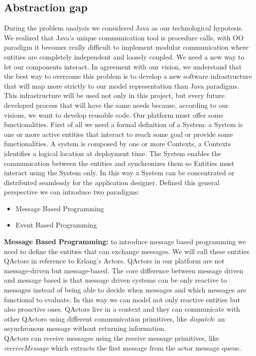 \subsection{Abstraction gap}
During the problem analysis we considered Java as our technological hypotesis.
We realized that Java’s unique communication tool is procedure calls, with
OO paradigm it becomes really difficult to implement modular communication
where entities are completely independent and loosely coupled. We need a new
way to let our components interact. In agreement with our vision, we understand
that the best way to overcome this problem is to develop a new software
infrastructure that will map more strictly to our model representation than Java
paradigms. This infrastructure will be used not only in this project, but every
future developed process that will have the same needs because, according to
our visions, we want to develop reusable code.
Our platform must offer some functionalities. First of all we need a formal definition
of a System:
a System is one or more active entities that interact to reach some goal or provide
some functionalities. A system is composed by one or more Contexts, a Contexts
identifies a logical location at deployment time. The System enables the communication
between the entities and synchronizes them so Entities must interact
using the System only. In this way a System can be concentrated or distributed
seamlessly for the application designer. Defined this general perspective we can
introduce two paradigms:
\begin{itemize}
	\item Message Based Programming
	\item Event Based Programming
\end{itemize}
\textbf{Message Based Programming:} to introduce message based programming we
need to define the entities that can exchange messages. We will call these entities
QActors in reference to Erlang’s Actors.
QActors in our platform are not message-driven but message-based. The core
difference between message driven and message based is that message driven
systems can be only reactive to messages instead of being able to decide when
messages and which messages are functional to evaluate. In this way we can
model not only reactive entities but also proactive ones. QActors live in a context
and they can communicate with other QActors using different communication
primitives, like \textit{dispatch}: an asynchronous message without returning information. \\
QActors can receive messages using the receive message primitives, like \textit{receiveMessage} which extracts the first message from the actor message queue. \\\\
